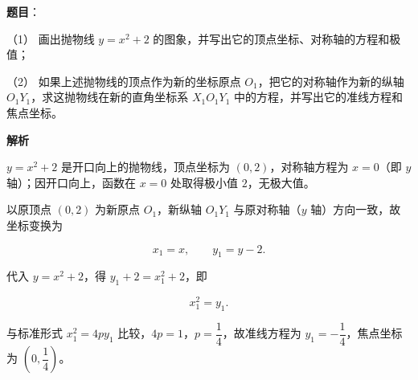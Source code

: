 \begin{answer}

\textbf{题目}：

（1） 画出抛物线 $y=x^2+2$ 的图象，并写出它的顶点坐标、对称轴的方程和极值；

（2） 如果上述抛物线的顶点作为新的坐标原点 $O_1$，把它的对称轴作为新的纵轴 $O_1Y_1$，求这抛物线在新的直角坐标系 $X_1O_1Y_1$ 中的方程，并写出它的准线方程和焦点坐标。

\textbf{解析}


$y=x^2+2$ 是开口向上的抛物线，顶点坐标为 $(0,2)$，对称轴方程为 $x=0$（即 $y$ 轴）；因开口向上，函数在 $x=0$ 处取得极小值 $2$，无极大值。


以原顶点 $(0,2)$ 为新原点 $O_1$，新纵轴 $O_1Y_1$ 与原对称轴（$y$ 轴）方向一致，故坐标变换为

\nopagebreak[4]
\[
x_1=x,\qquad y_1=y-2.
\]

代入 $y=x^2+2$，得 $y_1+2=x_1^2+2$，即

\nopagebreak[4]
\[
x_1^2=y_1.
\]

与标准形式 $x_1^2=4py_1$ 比较，$4p=1$，$p=\dfrac14$，故准线方程为 $y_1=-\dfrac14$，焦点坐标为 $\left(0,\dfrac14\right)$。



\end{answer}
